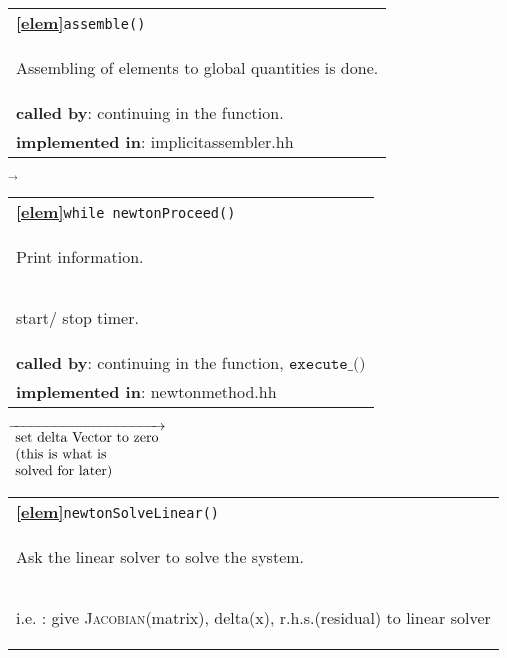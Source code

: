 \begin{landscape}
{\begin{tabular}{|l|}
      \hline
      \textbf{\textcircled{\ref{elem}}}\verb?assemble()? \\
      \begin{scriptsize}Assembling of elements to global quantities is done.\end{scriptsize}\\
      \textbf{called by}: continuing in the function. \\
      \textbf{implemented in}: implicitassembler.hh\\
	\hline
  \end{tabular}
\nextline
    {$\overrightarrow{}
    $}
   \begin{tabular}{|l|}
      \hline
      \textbf{\textcircled{\ref{elem}}}\verb?while newtonProceed()  ?\\
      \begin{scriptsize}Print information.\end{scriptsize}\\
      \begin{scriptsize}start/ stop timer.\end{scriptsize}\\
      \textbf{called by}: continuing in the function, $\texttt{execute\_()}$ \\
      \textbf{implemented in}: newtonmethod.hh\\
	\hline
  \end{tabular}
    {\scriptsize$\overrightarrow
				  {\begin{array}{l}
				  \textnormal{set delta Vector to zero} \\
				  \textnormal{(this is what is}\\
				  \textnormal{solved for later)}\\
                                \end{array}}
    $}
   \begin{tabular}{|l|}
      \hline
      \textbf{\textcircled{\ref{elem}}}\verb?newtonSolveLinear()  ?\\
      \begin{scriptsize}Ask the linear solver to solve the system.\end{scriptsize}\\
      \begin{scriptsize}i.e. : give \textsc{Jacobian}(matrix), delta(x), r.h.s.(residual) to linear solver\end{scriptsize}\\

\end{tabular}}
\end{landscape}
